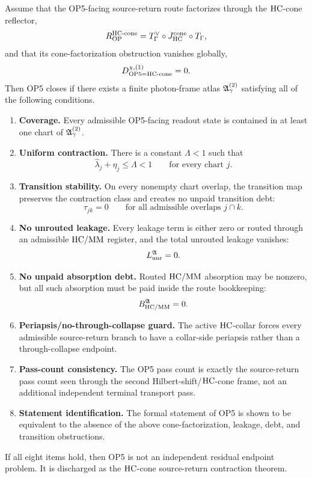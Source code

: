 \begin{theorem}
Assume that the OP5-facing source-return route factorizes through the \(\mathrm{HC}\)-cone reflector,
\[
R_{\mathrm{OP}}^{\mathrm{HC}\text{-}\mathrm{cone}}
= T_{\Gamma}^{\vee}\circ J_{\mathrm{HC}}^{\mathrm{cone}}\circ T_{\Gamma},
\]
and that its cone-factorization obstruction vanishes globally,
\[
D_{\mathrm{OP}5=\mathrm{HC}\text{-}\mathrm{cone}}^{\chi,(1)}=0.
\]
Then OP5 closes if there exists a finite photon-frame atlas \(\mathfrak A_{\gamma}^{(2)}\) satisfying all of the following conditions.

\begin{enumerate}
 \item \textbf{Coverage.} Every admissible OP5-facing readout state is contained in at least one chart of \(\mathfrak A_{\gamma}^{(2)}\).
 \item \textbf{Uniform contraction.} There is a constant \(\Lambda<1\) such that
 \[
 \widehat\lambda_j+\eta_j\le\Lambda<1
 \qquad\text{for every chart }j.
 \]
 \item \textbf{Transition stability.} On every nonempty chart overlap, the transition map preserves the contraction class and creates no unpaid transition debt:
 \[
 \tau_{jk}=0
 \qquad\text{for all admissible overlaps }j\cap k.
 \]
 \item \textbf{No unrouted leakage.} Every leakage term is either zero or routed through an admissible \(\mathrm{HC}/\mathrm{MM}\) register, and the total unrouted leakage vanishes:
 \[
 L_{\mathrm{unr}}^{\mathfrak A}=0.
 \]
 \item \textbf{No unpaid absorption debt.} Routed \(\mathrm{HC}/\mathrm{MM}\) absorption may be nonzero, but all such absorption must be paid inside the route bookkeeping:
 \[
 B_{\mathrm{HC}/\mathrm{MM}}^{\mathfrak A}=0.
 \]
 \item \textbf{Periapsis/no-through-collapse guard.} The active \(\mathrm{HC}\)-collar forces every admissible source-return branch to have a collar-side periapsis rather than a through-collapse endpoint.
 \item \textbf{Pass-count consistency.} The OP5 pass count is exactly the source-return pass count seen through the second Hilbert-shift/\(\mathrm{HC}\)-cone frame, not an additional independent terminal transport pass.
 \item \textbf{Statement identification.} The formal statement of OP5 is shown to be equivalent to the absence of the above cone-factorization, leakage, debt, and transition obstructions.
\end{enumerate}

If all eight items hold, then OP5 is not an independent residual endpoint problem. It is discharged as the \(\mathrm{HC}\)-cone source-return contraction theorem.
\end{theorem}

